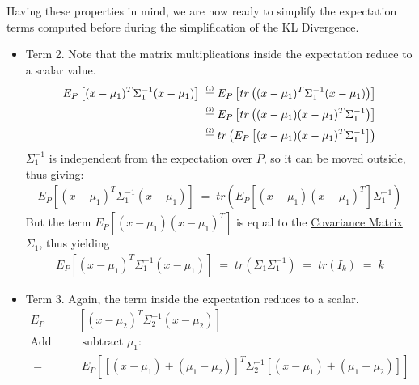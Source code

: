 \documentclass[12pt]{report}
\newcommand\prone{\mathrel{\overset{\makebox[0pt]{\mbox{\normalfont\tiny\sffamily (1)}}}{=}}}
\newcommand\prtwo{\mathrel{\overset{\makebox[0pt]{\mbox{\normalfont\tiny\sffamily (2)}}}{=}}}
\newcommand\prthr{\mathrel{\overset{\makebox[0pt]{\mbox{\normalfont\tiny\sffamily (3)}}}{=}}}
\begin{document}
\noindent Having these properties in mind, we are now ready to simplify the
expectation terms computed before during the simplification of the KL Divergence.

\begin{itemize}
    \item Term 2. Note that the matrix multiplications inside the expectation reduce
        to a scalar value.
        \begin{align*}
            E_P \left[ (x-\mu_1)^T\Sigma_1^{-1} (x - \mu_1) \right]
            \;\prone\;& E_P \left[ tr\left((x-\mu_1)^T\Sigma_1^{-1}
                (x - \mu_1)\right) \right] \\
            \;\prthr\;& E_P \left[ tr\left( (x - \mu_1)(x - \mu_1)^T
                \Sigma_1^{-1} \right) \right] \\
            \;\prtwo\;& tr\left( E_P\left[ (x - \mu_1)(x - \mu_1)^T
                \Sigma_1^{-1} \right] \right)
        \end{align*}
        $\Sigma_1^{-1}$ is independent from the expectation over $P$, so it can be moved
        outside, thus giving:
        \begin{align*}
            E_P \left[ (x-\mu_1)^T\Sigma_1^{-1} (x - \mu_1) \right] \;=\;
                tr\left( E_P\left[ (x - \mu_1)(x - \mu_1)^T
                    \right] \Sigma_1^{-1} \right)
        \end{align*}
        But the term $E_P\left[ (x - \mu_1)(x - \mu_1)^T \right]$ is equal to the
        \href{https://en.wikipedia.org/wiki/Covariance_matrix#Definition}
        {Covariance Matrix} $\Sigma_1$, thus yielding
        \begin{align}\label{eq:kld_term2}
            E_P \left[ (x-\mu_1)^T\Sigma_1^{-1} (x - \mu_1) \right]
                \;=\; tr\left( \Sigma_1 \Sigma_1^{-1} \right) \;=\; tr(I_k) \;=\; k
        \end{align}
    \item Term 3. Again, the term inside the expectation reduces to a scalar.
        \begin{align*}
            E_P &\left[ (x - \mu_2)^T\Sigma_2^{-1} (x - \mu_2) \right] \\[2ex]
            \mbox{Add and}& \mbox{ subtract } \mu_1: \\[2ex]
            \;=&\; E_P \left[ [(x - \mu_1) + (\mu_1 - \mu_2)]^T\Sigma_2^{-1}
                [(x - \mu_1) + (\mu_1 - \mu_2)] \right] \\[2ex]

\end{align*}
\end{itemize}
\end{document}
